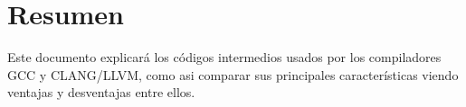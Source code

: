 \hspace{0pt}
\vfill

\section*{\centering Resumen}
Este documento explicará los códigos intermedios usados por los compiladores GCC y CLANG/LLVM, 
como asi comparar sus principales características viendo ventajas y desventajas 
entre ellos.


\vfill
\hspace{0pt}







